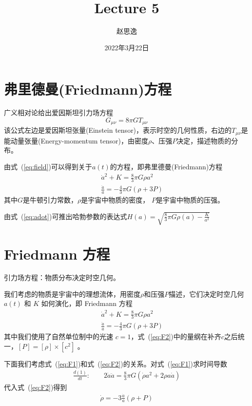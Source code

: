\documentclass[12pt]{ctexart}
\title{Lecture 5}
\author{赵思逸}
\date{2022年3月22日}
\newcommand{\refeq}[1]{式~(\ref{#1})}
\begin{document}
\maketitle

\section{弗里德曼(Friedmann)方程}

广义相对论给出爱因斯坦引力场方程
\begin{equation} \label{eq:field}
    G_{\mu \nu} = 8 \pi G T_{\mu \nu}
\end{equation}
该公式左边是爱因斯坦张量(Einstein tensor)，表示时空的几何性质，右边的$T_{\mu\nu}$是能动量张量(Energy-momentum tensor)，由密度$\rho$、压强$P$决定，描述物质的分布。

由\refeq{eq:field}可以得到关于$a(t)$的方程，即弗里德曼(Friedmann)方程
\begin{eqnarray}
    &&\dot{a}^2+K = \frac{8}{3} \pi G \rho a^2 \label{eq:adot} \\
    &&\frac{\ddot{a}}{a} = -\frac{4}{3} \pi G (\rho + 3P)
\end{eqnarray}
其中$G$是牛顿引力常数，$\rho$是宇宙中物质的密度， $P$是宇宙中物质的压强。 

由\refeq{eq:adot}可推出哈勃参数的表达式$H(a)=\sqrt{\frac{8}{3}\pi G \rho(a)-\frac{K}{a^2}}$


\section{ Friedmann 方程}

引力场方程：物质分布决定时空几何。

我们考虑的物质是宇宙中的理想流体，用密度$\rho$和压强$P$描述，它们决定时空几何 $a(t)$ 和 $K$ 如何演化，即 Friedmann 方程
\begin{eqnarray}
    &&\dot{a}^2+K = \frac{8}{3} \pi G \rho a^2 \label{eq:adot} \label{eq:F1}\\
    &&\frac{\ddot{a}}{a} = -\frac{4}{3} \pi G (\rho + 3P) \label{eq:F2}
\end{eqnarray}
其中我们使用了自然单位制中的光速 $c=1$，\refeq{eq:F2}中的量纲在补齐$c$之后统一，$[P]=[\rho] \times [c^2]$ 。

下面我们考虑\refeq{eq:F1}和\refeq{eq:F2}的关系。对\refeq{eq:F1}求时间导数
\begin{eqnarray}
    \frac{d(1)}{dt} : \qquad 2\dot{a}\ddot{a} = \frac{8}{3} \pi G (\dot{\rho} a^2 + 2\rho a \dot{a})
\end{eqnarray}
代入\refeq{eq:F2}得到
\begin{eqnarray}
    \dot{\rho} = -3\frac{\dot{a}}{a}(\rho+P) \label{eq:EnergyCon}
\end{eqnarray}
\end{document}
